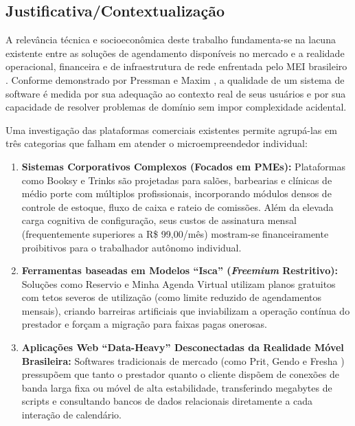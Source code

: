 \documentclass[12pt,a4paper]{article}
\begin{document}
\subsection{Justificativa/Contextualização}
\label{subsec:justificativa}

A relevância técnica e socioeconômica deste trabalho fundamenta-se na lacuna existente entre as soluções de agendamento disponíveis no mercado e a realidade operacional, financeira e de infraestrutura de rede enfrentada pelo MEI brasileiro \cite{sebrae_digital, sebrae_pr, sebrae_recorde}. Conforme demonstrado por Pressman e Maxim \cite{pressman2021}, a qualidade de um sistema de software é medida por sua adequação ao contexto real de seus usuários e por sua capacidade de resolver problemas de domínio sem impor complexidade acidental.

Uma investigação das plataformas comerciais existentes permite agrupá-las em três categorias que falham em atender o microempreendedor individual:
\begin{enumerate}
    \item \textbf{Sistemas Corporativos Complexos (Focados em PMEs):} Plataformas como Booksy \cite{booksy_br, booksy_pricing} e Trinks \cite{trinks_planos, trinks_home} são projetadas para salões, barbearias e clínicas de médio porte com múltiplos profissionais, incorporando módulos densos de controle de estoque, fluxo de caixa e rateio de comissões. Além da elevada carga cognitiva de configuração, seus custos de assinatura mensal (frequentemente superiores a R\$ 99,00/mês) mostram-se financeiramente proibitivos para o trabalhador autônomo individual.
    \item \textbf{Ferramentas baseadas em Modelos ``Isca'' (\textit{Freemium} Restritivo):} Soluções como Reservio \cite{reservio_br, reservio_pt} e Minha Agenda Virtual utilizam planos gratuitos com tetos severos de utilização (como limite reduzido de agendamentos mensais), criando barreiras artificiais que inviabilizam a operação contínua do prestador e forçam a migração para faixas pagas onerosas.
    \item \textbf{Aplicações Web ``Data-Heavy'' Desconectadas da Realidade Móvel Brasileira:} Softwares tradicionais de mercado (como Prit, Gendo e Fresha \cite{fresha_play}) pressupõem que tanto o prestador quanto o cliente dispõem de conexões de banda larga fixa ou móvel de alta estabilidade, transferindo megabytes de scripts e consultando bancos de dados relacionais diretamente a cada interação de calendário.
\end{enumerate}
\end{document}
